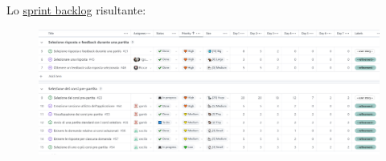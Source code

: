 
Lo \href{https://github.com/orgs/ISIQuiz/projects/3/}{sprint backlog} risultante:

\begin{figure}[H]
    \centering
    \includegraphics[width=\textwidth]{process/Img/Sprint6BL1.jpg}
    \label{fig:Sprint7BL}
\end{figure}